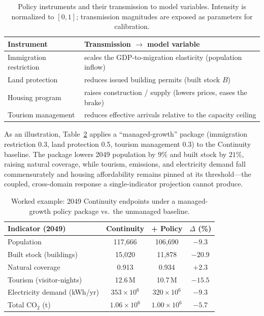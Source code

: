 \documentclass[urbansci,article,submit,pdftex,moreauthors]{Definitions/mdpi}
\begin{document}
\begin{table}[H]
\caption{Policy instruments and their transmission to model variables. Intensity is
normalized to $[0,1]$; transmission magnitudes are exposed as parameters for
calibration.}
\label{tab:policy}
\begin{tabularx}{\textwidth}{lX}
\toprule
\textbf{Instrument} & \textbf{Transmission $\rightarrow$ model variable} \\
\midrule
Immigration restriction & scales the GDP-to-migration elasticity (population inflow) \\
Land protection         & reduces issued building permits (built stock $B$) \\
Housing program         & raises construction / supply (lowers prices, eases the brake) \\
Tourism management      & reduces effective arrivals relative to the capacity ceiling \\
\bottomrule
\end{tabularx}
\end{table}

As an illustration, Table~\ref{tab:policy_demo} applies a ``managed-growth'' package
(immigration restriction 0.3, land protection 0.5, tourism management 0.3) to the
Continuity baseline. The package lowers 2049 population by $9\%$ and built stock by
$21\%$, raising natural coverage, while tourism, emissions, and electricity demand
fall commensurately and housing affordability remains pinned at its threshold---the
coupled, cross-domain response a single-indicator projection cannot produce.

\begin{table}[H]
\caption{Worked example: 2049 Continuity endpoints under a managed-growth policy
package vs.\ the unmanaged baseline.}
\label{tab:policy_demo}
\begin{tabularx}{\textwidth}{Xccc}
\toprule
\textbf{Indicator (2049)} & \textbf{Continuity} & \textbf{+ Policy} & \textbf{$\Delta$ (\%)} \\
\midrule
Population                 & 117{,}666 & 106{,}690 & $-9.3$ \\
Built stock (buildings)    & 15{,}020  & 11{,}878  & $-20.9$ \\
Natural coverage           & 0.913     & 0.934     & $+2.3$ \\
Tourism (visitor-nights)   & 12.6\,M   & 10.7\,M   & $-15.5$ \\
Electricity demand (kWh/yr)& $353\times10^6$ & $320\times10^6$ & $-9.3$ \\
Total CO$_2$ (t)           & $1.06\times10^6$ & $1.00\times10^6$ & $-5.7$ \\
\bottomrule
\end{tabularx}
\end{table}
\end{document}
